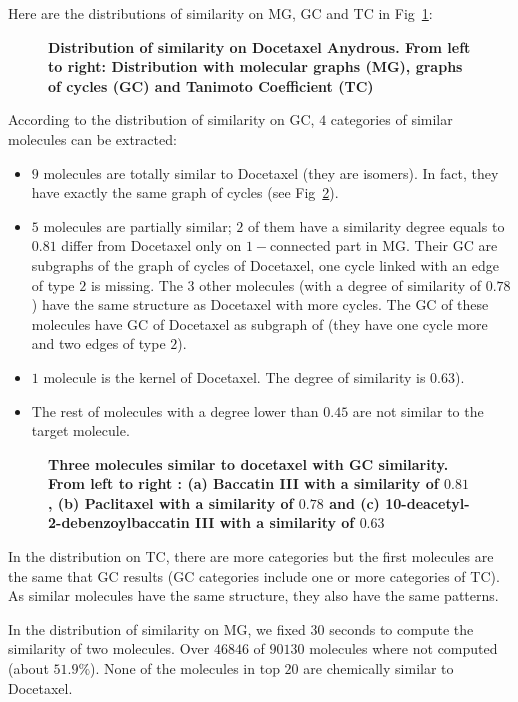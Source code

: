 \documentclass[10pt,letterpaper]{article}
\begin{document}
  Here are the distributions of similarity on MG, GC and TC in Fig~\ref{fig6}:
  
 \begin{figure}[!h]
	\caption{\bf{Distribution of similarity on Docetaxel Anydrous.}
	From left to right: Distribution with molecular graphs (MG), graphs of cycles (GC) and Tanimoto Coefficient (TC)}
	\label{fig6}
 \end{figure}
 
 According to the distribution of similarity on GC, $4$ categories of similar molecules can be extracted:
 
 \begin{itemize}
 
 \item $9$ molecules are totally similar to Docetaxel (they are isomers). In fact, they have exactly the same graph of cycles (see Fig~\ref{fig7}). 
 \item $5$ molecules are partially similar; $2$ of them have a similarity degree equals to $0.81$ differ from Docetaxel only on $1-$connected part in MG. Their GC are subgraphs of the graph of cycles of Docetaxel, one cycle linked with an edge of type $2$ is missing.  The $3$ other molecules (with a degree of similarity of $0.78$) have the same structure as Docetaxel with more cycles. The GC of these molecules have GC of Docetaxel as subgraph of (they have one cycle more and two edges of type $2$).
 \item $1$ molecule is the kernel of Docetaxel. The degree of similarity is $0.63$).
 \item The rest of molecules with a degree lower than $0.45$ are not similar to the target molecule. 
\end{itemize}  
 
  \begin{figure}[!h]
	\caption{\bf{Three molecules similar to docetaxel with GC similarity.}
	From left to right : (a) Baccatin III with a similarity of $0.81$, (b) Paclitaxel with a similarity of $0.78$ and (c) 10-deacetyl-2-debenzoylbaccatin III with a similarity of $0.63$}
	\label{fig7}
\end{figure}
In the distribution on TC, there are more categories but the first molecules are the same that GC results (GC categories include one or more categories of TC). As similar molecules have the same structure, they also have the same patterns.
  
In the distribution of similarity on MG, we fixed $30$ seconds to compute the similarity of two molecules. Over $46846$ of $90130$ molecules where not computed (about  $51.9 \%$). None of the molecules in top $20$ are chemically similar to Docetaxel.
\end{document}
